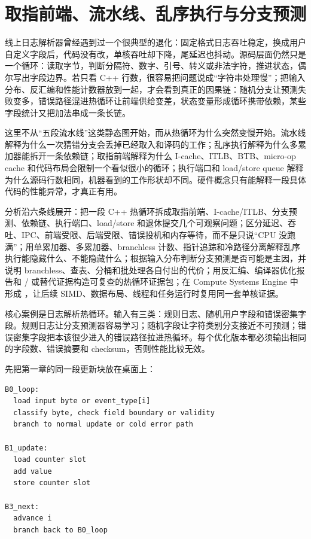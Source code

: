 \chapter{取指前端、流水线、乱序执行与分支预测}

线上日志解析器曾经遇到过一个很典型的退化：固定格式日志吞吐稳定，换成用户自定义字段后，代码没有改，单核吞吐却下降，尾延迟也抖动。源码层面仍然只是一个循环：读取字节，判断分隔符、数字、引号、转义或非法字符，推进状态，偶尔写出字段边界。若只看 C++ 行数，很容易把问题说成“字符串处理慢”；把输入分布、反汇编和性能计数器放到一起，才会看到真正的因果链：随机分支让预测失败变多，错误路径混进热循环让前端供给变差，状态变量形成循环携带依赖，某些字段统计又把加法串成一条长链。

这里不从“五段流水线”这类静态图开始，而从热循环为什么突然变慢开始。流水线解释为什么一次猜错分支会丢掉已经取入和译码的工作；乱序执行解释为什么多累加器能拆开一条依赖链；取指前端解释为什么 I-cache、ITLB、BTB、micro-op cache 和代码布局会限制一个看似很小的循环；执行端口和 load/store queue 解释为什么源码行数相同，机器看到的工作形状却不同。硬件概念只有能解释一段具体代码的性能异常，才真正有用。

分析沿六条线展开：把一段 C++ 热循环拆成取指前端、I-cache/ITLB、分支预测、依赖链、执行端口、load/store 和退休提交几个可观察问题；区分延迟、吞吐、IPC、前端受限、后端受限、错误投机和内存等待，而不是只说“CPU 没跑满”；用单累加器、多累加器、branchless 计数、指针追踪和冷路径分离解释乱序执行能隐藏什么、不能隐藏什么；根据输入分布判断分支预测是否可能是主因，并说明 branchless、查表、分桶和批处理各自付出的代价；用反汇编、编译器优化报告和 / 或替代证据构造可复查的热循环证据包；在 Compute Systems Engine 中形成 ，让后续 SIMD、数据布局、线程和任务运行时复用同一套单核证据。

\begin{casebox}
核心案例是日志解析热循环。输入有三类：规则日志、随机用户字段和错误密集字段。规则日志让分支预测器容易学习；随机字段让字符类别分支接近不可预测；错误密集字段把本该很少进入的错误路径拉进热循环。每个优化版本都必须输出相同的字段数、错误摘要和 checksum，否则性能比较无效。
\end{casebox}

先把第一章的同一段更新块放在桌面上：

\begin{lstlisting}[numbers=none,caption={这段热循环的核心内部形状}]
B0_loop:
  load input byte or event_type[i]
  classify byte, check field boundary or validity
  branch to normal update or cold error path

B1_update:
  load counter slot
  add value
  store counter slot

B3_next:
  advance i
  branch back to B0_loop
\end{lstlisting}

